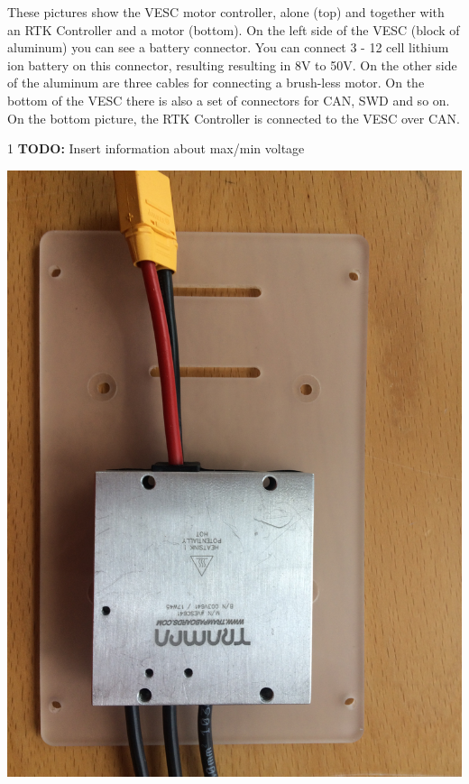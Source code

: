 \documentclass[12pt]{article} %
\def\printtodos{0}
\newcommand{\todo}[1]{
  \if\printtodos1
      {\color{red} \textbf{TODO:} #1}
  \fi}
\begin{document}
\vspace{5mm}

\noindent \begin{minipage}{0.66\textwidth} These pictures show the
  VESC motor controller, alone (top) and together with an RTK
  Controller and a motor (bottom). On the left side of the VESC (block
  of aluminum) you can see a battery connector. You can connect 3 -
  12 cell lithium ion battery on this connector, resulting resulting
  in 8V to 50V. On the other side of the aluminum are three cables
  for connecting a brush-less motor.  On the bottom of the VESC there
  is also a set of connectors for CAN, SWD and so on. On the bottom
  picture, the RTK Controller is connected to the VESC over CAN.
  \todo{Insert information about max/min voltage}
\end{minipage}
\begin{minipage}{0.33\textwidth} %
  \noindent \includegraphics[width=\textwidth]{./photos/VESC.JPG}

\end{minipage}
\end{document}

